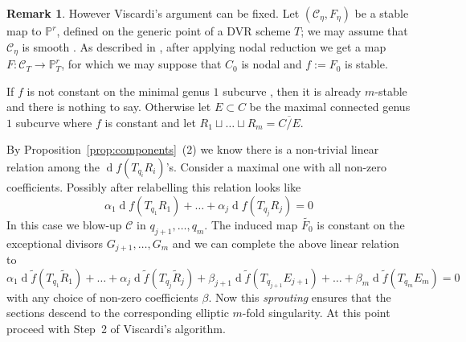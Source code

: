 \documentclass[11pt]{amsart}
\newcommand{\PP}{\mathbb P}
\renewcommand{\to}{\rightarrow}
\theoremstyle{plain}
\theoremstyle{definition}
\newtheorem{remark}[thm]{Remark}
\begin{document}
\begin{remark}
However Viscardi's argument can be fixed. Let $(\mathcal{C}_\eta,F_{\eta})$ be a stable map to $\PP^r$, defined on the generic point of a DVR scheme $T$; we may assume that $\mathcal C_{\eta}$ is smooth \cite[Section~3.2.1]{VISC}. 
As described in \cite[Theorem~3.6, Step~1]{VISC}, after applying nodal reduction we get a map $F\colon\mathcal C_T\to\PP^r_{T}$, for which we may suppose that $C_0$ is nodal and $f:=F_0$ is stable.

If $f$ is not constant on the minimal genus $1$ subcurve \cite{SMY1}, then it is already $m$-stable and there is nothing to say. Otherwise let $E\subset C$ be the maximal connected genus $1$ subcurve where $f$ is constant and let $R_1\sqcup\dots\sqcup R_m=\overline{C/E}$.

 By Proposition~\ref{prop:components}~(2) we know there is a non-trivial linear relation among the $\operatorname{d}\!f(T_{q_i}R_i)$'s.
 Consider a maximal one with all non-zero coefficients.  Possibly after relabelling this relation looks like
 \begin{equation*}\label{eq:linrelation}
 \alpha_1\operatorname{d}\!f(T_{q_{1}}R_{1})+\ldots +\alpha_j \operatorname{d}\!f(T_{q_{j}}R_{j})=0
 \end{equation*}
 In this case we blow-up $\mathcal{C}$ in $q_{j+1},\ldots, q_m$. The induced map $\tilde{F_0}$ is constant on the exceptional divisors $G_{j+1},\ldots, G_m$ and we can complete the above linear relation to 
 \[\alpha_1\operatorname{d}\!\tilde f(T_{q_{1}}\tilde R_{1})+\ldots +\alpha_j \operatorname{d}\!\tilde f(T_{q_{j}}\tilde R_{j})+\beta_{j+1}\operatorname{d}\!\tilde f(T_{q_{j+1}}E_{j+1})+\ldots+\beta_m\operatorname{d}\!\tilde f(T_{q_{m}}E_m)=0\]
  with any choice of non-zero coefficients $\beta$. Now this \emph{sprouting} \cite[Section 2.3]{SMY2} ensures that the sections descend to the corresponding elliptic $m$-fold singularity. At this point proceed with Step~2 of Viscardi's algorithm.
  

\end{remark}
\end{document}
